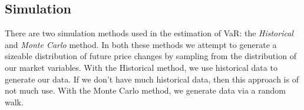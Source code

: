 \documentclass[../Dissertation.tex]{subfiles}
\begin{document}
\subsection{Simulation}
There are two simulation methods used in the estimation of VaR: the \textit{Historical} and \textit{Monte Carlo} method.
In both these methods we attempt to generate a sizeable distribution of future price changes by sampling from the distribution of our market variables.
With the Historical method, we use historical data to generate our data. 
If we don't have much historical data, then this approach is of not much use.
With the Monte Carlo method, we generate data via a random walk.
\end{document}
